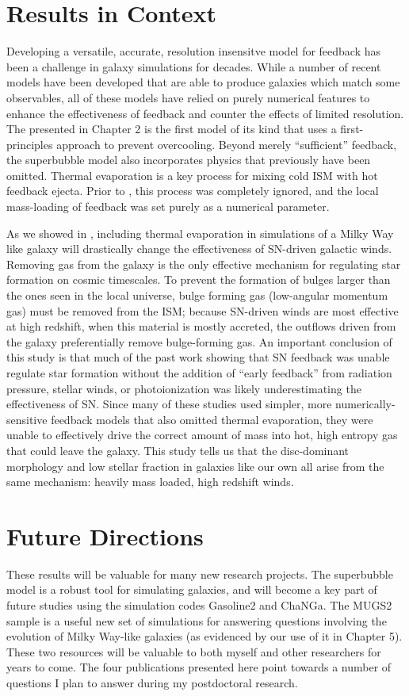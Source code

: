 \section{Results in Context}
Developing a versatile, accurate, resolution insensitve model for feedback has
been a challenge in galaxy simulations for decades.  While a number of recent
models have been developed that are able to produce galaxies which match some
observables, all of these models have relied on purely numerical features to
enhance the effectiveness of feedback and counter the effects of limited
resolution.  The \citet{Keller2014} presented in Chapter 2 is the first model of
its kind that uses a first-principles approach to prevent overcooling.  Beyond
merely ``sufficient'' feedback, the superbubble model also incorporates physics
that previously have been omitted.  Thermal evaporation is a key process for
mixing cold ISM with hot feedback ejecta.  Prior to \citet{Keller2014}, this
process was completely ignored, and the local mass-loading of feedback was set
purely as a numerical parameter.  

As we showed in \citet{Keller2015}, including thermal evaporation in simulations
of a Milky Way like galaxy will drastically change the effectiveness of
SN-driven galactic winds.  Removing gas from the galaxy is the only effective
mechanism for regulating star formation on cosmic timescales.  To prevent the
formation of bulges larger than the ones seen in the local universe, bulge
forming gas (low-angular momentum gas) must be removed from the ISM; because
SN-driven winds are most effective at high redshift, when this material is
mostly accreted, the outflows driven from the galaxy preferentially remove
bulge-forming gas.  An important conclusion of this study is that much of the
past work showing that SN feedback was unable regulate star formation without
the addition of ``early feedback'' from radiation pressure, stellar winds, or
photoionization was likely underestimating the effectiveness of SN.  Since many
of these studies used simpler, more numerically-sensitive feedback models that
also omitted thermal evaporation, they were unable to effectively drive the
correct amount of mass into hot, high entropy gas that could leave the galaxy.
This study tells us that the disc-dominant morphology and low stellar fraction
in galaxies like our own all arise from the same mechanism:  heavily mass
loaded, high redshift winds.

\section{Future Directions}
These results will be valuable for many new research projects.  The superbubble
model is a robust tool for simulating galaxies, and will become a key part of
future studies using the simulation codes {\sc Gasoline2} and {\sc ChaNGa}.  The
MUGS2 sample is a useful new set of simulations for answering questions
involving the evolution of Milky Way-like galaxies (as evidenced by our use of
it in Chapter 5).  These two resources will be valuable to both myself and other
researchers for years to come. The four publications presented here point
towards a number of questions I plan to answer during my postdoctoral research.  

